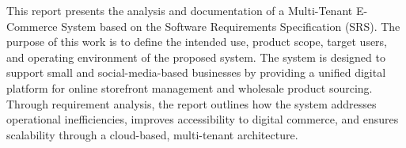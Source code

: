This report presents the analysis and documentation of a Multi-Tenant E-Commerce System based on the Software Requirements Specification (SRS). The purpose of this work is to define the intended use, product scope, target users, and operating environment of the proposed system. The system is designed to support small and social-media-based businesses by providing a unified digital platform for online storefront management and wholesale product sourcing. Through requirement analysis, the report outlines how the system addresses operational inefficiencies, improves accessibility to digital commerce, and ensures scalability through a cloud-based, multi-tenant architecture.
\endinput
